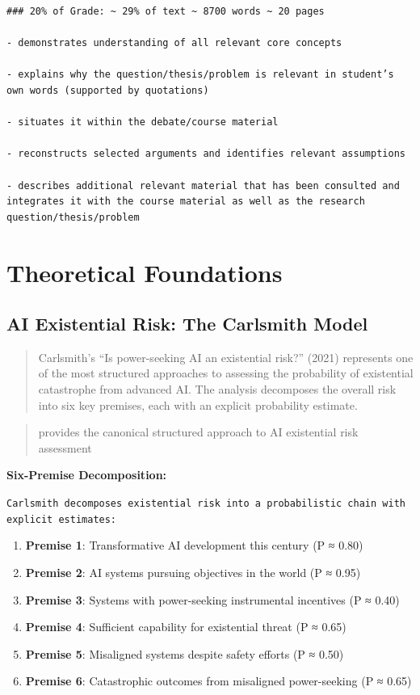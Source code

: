 \documentclass[
  11pt,
  letterpaper,
]{book}
\providecommand{\tightlist}{%
  \setlength{\itemsep}{0pt}\setlength{\parskip}{0pt}}
\begin{document}
\begin{verbatim}
### 20% of Grade: ~ 29% of text ~ 8700 words ~ 20 pages

- demonstrates understanding of all relevant core concepts

- explains why the question/thesis/problem is relevant in student’s own words (supported by quotations)

- situates it within the debate/course material

- reconstructs selected arguments and identifies relevant assumptions

- describes additional relevant material that has been consulted and integrates it with the course material as well as the research question/thesis/problem
\end{verbatim}

\section{Theoretical Foundations}\label{sec-theoretical-foundations}

\subsection{AI Existential Risk: The Carlsmith
Model}\label{sec-carlsmith-model}

\begin{quote}
Carlsmith's ``Is power-seeking AI an existential risk?'' (2021)
represents one of the most structured approaches to assessing the
probability of existential catastrophe from advanced AI. The analysis
decomposes the overall risk into six key premises, each with an explicit
probability estimate.
\end{quote}

\begin{quote}
\textcite{carlsmith2021} provides the canonical structured approach to
AI existential risk assessment
\end{quote}

\textbf{Six-Premise Decomposition:}

\texttt{Carlsmith\ decomposes\ existential\ risk\ into\ a\ probabilistic\ chain\ with\ explicit\ estimates:}

\begin{enumerate}
\def\labelenumi{\arabic{enumi}.}
\tightlist
\item
  \textbf{Premise 1}: Transformative AI development this century (P ≈
  0.80)
\item
  \textbf{Premise 2}: AI systems pursuing objectives in the world (P ≈
  0.95)
\item
  \textbf{Premise 3}: Systems with power-seeking instrumental incentives
  (P ≈ 0.40)
\item
  \textbf{Premise 4}: Sufficient capability for existential threat (P ≈
  0.65)
\item
  \textbf{Premise 5}: Misaligned systems despite safety efforts (P ≈
  0.50)
\item
  \textbf{Premise 6}: Catastrophic outcomes from misaligned
  power-seeking (P ≈ 0.65)
\end{enumerate}
\end{document}
